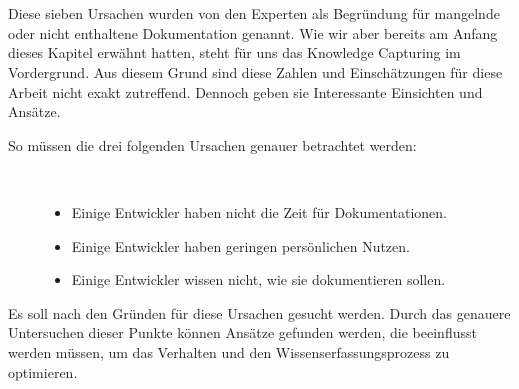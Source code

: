 \documentclass[a4paper,12pt,twoside]{scrartcl}
\begin{document}
\\\\
Diese sieben Ursachen wurden von den Experten als Begründung für mangelnde oder nicht enthaltene Dokumentation genannt. Wie wir aber bereits am Anfang dieses Kapitel erwähnt hatten, steht für uns das Knowledge Capturing im Vordergrund. Aus diesem Grund sind diese Zahlen und Einschätzungen für diese Arbeit nicht exakt zutreffend. Dennoch geben sie Interessante Einsichten und Ansätze.    
\begin{description}
   \item[So müssen die drei folgenden Ursachen genauer betrachtet werden:]~\par
   \begin{itemize}
      \item Einige Entwickler haben nicht die Zeit für Dokumentationen.
      \item Einige Entwickler haben geringen persönlichen Nutzen.
      \item Einige Entwickler wissen nicht, wie sie dokumentieren sollen.
   \end{itemize}
\end{description}
Es soll nach den Gründen für diese Ursachen gesucht werden. Durch das genauere Untersuchen dieser Punkte können Ansätze gefunden werden, die beeinflusst werden müssen, um das Verhalten und den Wissenserfassungsprozess zu optimieren. 
\end{document}
